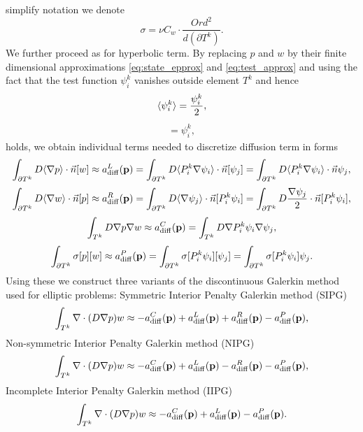 simplify notation 
we denote
\begin{equation}
\label{eq:diff_penalty_sigma}
\sigma = \nu C_w \cdot \frac{Ord^2}{d(\partial T^k)}.
\end{equation} 
We further proceed as for hyperbolic term. By replacing $p$ and $w$ by their 
finite dimensional approximations \eqref{eq:state_epprox} and 
\eqref{eq:test_approx} and using the fact that the test function $\psi^k_i$ 
vanishes outside element $T^k$ and hence
\begin{eqnarray}
\langle\psi^k_i\rangle = \frac{\psi^k_i}{2},
\end{eqnarray}
\begin{eqnarray}
[\psi^k_i] = \psi^k_i,
\end{eqnarray}
holds, we obtain individual terms needed to discretize diffusion term in forms
\begin{equation}
\label{eq:diff_left_approx}
\int_{\partial T^k} D \langle\nabla p\rangle \cdot \vec{n} [w] 
\approx
a^L_\mathrm{diff}(\mathbf{p}) = 
\int_{\partial T^k} D \langle P^k_i\nabla\psi_i\rangle \cdot \vec{n}[\psi_j] =
\int_{\partial T^k} D \langle P^k_i\nabla\psi_i\rangle \cdot \vec{n}\psi_j,
\end{equation}
\begin{equation}
\label{eq:diff_right_approx}
\int_{\partial T^k} D \langle\nabla w \rangle\cdot \vec{n} [p] 
\approx
a^R_\mathrm{diff}(\mathbf{p}) =
\int_{\partial T^k} D \langle\nabla \psi_j \rangle\cdot \vec{n} [P^k_i\psi_i] =
\int_{\partial T^k} D \frac{\nabla \psi_j}{2}\cdot \vec{n} 
[P^k_i\psi_i],
\end{equation}
\begin{equation}
\label{eq:diff_laplace_approx}
\int_{T^k} D\nabla p \nabla w 
\approx
a^C_\mathrm{diff}(\mathbf{p})=
\int_{T^k} D\nabla P^k_i\psi_i \nabla \psi_j,
\end{equation}
\begin{equation}
\label{eq:diff_penalty_approx}
\int_{\partial T^k} \sigma [p][w] 
\approx
a^P_\mathrm{diff}(\mathbf{p})=
\int_{\partial T^k} \sigma [P^k_i\psi_i][\psi_j] 
= \int_{\partial T^k} \sigma [P^k_i\psi_i]\psi_j.
\end{equation}
Using these we construct three variants of the discontinuous Galerkin method used for 
elliptic problems: Symmetric Interior Penalty Galerkin method (SIPG)
\begin{equation}
\label{eq:sipg}
\int_{T^k}\nabla\cdot(D\nabla p) w \approx - a^C_\mathrm{diff}(\mathbf{p}) 
+ a^L_\mathrm{diff}(\mathbf{p}) + a^R_\mathrm{diff}(\mathbf{p}) 
- a^P_\mathrm{diff}(\mathbf{p}),
\end{equation}
Non-symmetric Interior Penalty Galerkin method (NIPG)
\begin{equation}
\label{eq:nipg}
\int_{T^k}\nabla\cdot(D\nabla p) w \approx - a^C_\mathrm{diff}(\mathbf{p})  
+ a^L_\mathrm{diff}(\mathbf{p}) - a^R_\mathrm{diff}(\mathbf{p})  
- a^P_\mathrm{diff}(\mathbf{p}),
\end{equation}
Incomplete Interior Penalty Galerkin method (IIPG)
\begin{equation}
\label{eq:iipg}
\int_{T^k}\nabla\cdot(D\nabla p) w \approx - a^C_\mathrm{diff}(\mathbf{p})  
+ a^L_\mathrm{diff}(\mathbf{p})
- a^P_\mathrm{diff}(\mathbf{p}).
\end{equation}

